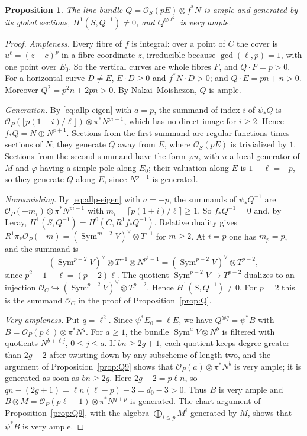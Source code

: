 \documentclass[11pt,a4paper]{article}
\theoremstyle{plain}
\newtheorem{proposition}[theorem]{Proposition}
\theoremstyle{remark}
\newcommand{\OO}{\mathcal O}
\newcommand{\Sym}{\operatorname{Sym}}
\begin{document}
\begin{proposition}\label{prop:allp-Q}
The line bundle $Q=\OO_S(pE)\otimes f^*N$ is ample and generated by its global sections, $H^1(S,Q^{-1})\neq0$, and
$Q^{\otimes\ell^2}$ is very ample.
\end{proposition}

\begin{proof}
\emph{Ampleness.} Every fibre of $f$ is integral: over a point of $C$ the cover is $u^{\ell}=(z-c)^p$ in a fibre
coordinate $z$, irreducible because $\gcd(\ell,p)=1$, with one point over $E_0$. So the vertical curves are whole
fibres $F$, and $Q\cdot F=p>0$. For a horizontal curve $D\ne E$, $E\cdot D\geq0$ and $f^*N\cdot D>0$; and
$Q\cdot E=pn+n>0$. Moreover $Q^2=p^2n+2pn>0$. By Nakai--Moishezon, $Q$ is ample.

\emph{Generation.} By \eqref{eq:allp-eigen} with $a=p$, the summand of index $i$ of $\psi_*Q$ is
$\OO_P(\lfloor p(1-i)/\ell\rfloor)\otimes\pi^*N^{pi+1}$, which has no direct image for $i\geq2$. Hence
$f_*Q=N\oplus N^{p+1}$. Sections from the first summand are regular functions times sections of $N$; they generate $Q$
away from $E$, where $\OO_S(pE)$ is trivialized by $1$. Sections from the second summand have the form $\varphi u$,
with $u$ a local generator of $M$ and $\varphi$ having a simple pole along $E_0$; their valuation along $E$ is
$1-\ell=-p$, so they generate $Q$ along $E$, since $N^{p+1}$ is generated.

\emph{Nonvanishing.} By \eqref{eq:allp-eigen} with $a=-p$, the summands of $\psi_*Q^{-1}$ are
$\OO_P(-m_i)\otimes\pi^*N^{pi-1}$ with $m_i=\lceil p(1+i)/\ell\rceil\geq1$. So $f_*Q^{-1}=0$ and, by Leray,
$H^1(S,Q^{-1})=H^0(C,R^1f_*Q^{-1})$. Relative duality gives $R^1\pi_*\OO_P(-m)=(\Sym^{m-2}V)^\vee\otimes T^{-1}$ for
$m\geq2$. At $i=p$ one has $m_p=p$, and the summand is
\[
 (\Sym^{p-2}V)^\vee\otimes T^{-1}\otimes N^{p^2-1}=(\Sym^{p-2}V)^\vee\otimes T^{p-2},
\]
since $p^2-1-\ell=(p-2)\ell$. The quotient $\Sym^{p-2}V\to T^{p-2}$ dualizes to an injection
$\OO_C\hookrightarrow(\Sym^{p-2}V)^\vee\otimes T^{p-2}$. Hence $H^1(S,Q^{-1})\neq0$. For $p=2$ this is the summand
$\OO_C$ in the proof of Proposition~\ref{prop:Q}.

\emph{Very ampleness.} Put $q=\ell^2$. Since $\psi^*E_0=\ell E$, we have $Q^{\otimes q}=\psi^*B$ with
$B=\OO_P(p\ell)\otimes\pi^*N^{q}$. For $a\geq1$, the bundle $\Sym^aV\otimes N^b$ is filtered with quotients
$N^{b+\ell j}$, $0\le j\le a$. If $bn\geq2g+1$, each quotient keeps degree greater than $2g-2$ after twisting down by
any subscheme of length two, and the argument of Proposition~\ref{prop:Q9} shows that $\OO_P(a)\otimes\pi^*N^b$ is very
ample; it is generated as soon as $bn\geq2g$. Here $2g-2=p\ell n$, so $qn-(2g+1)=\ell n(\ell-p)-3=d_0-3>0$. Thus $B$ is
very ample and $B\otimes M=\OO_P(p\ell-1)\otimes\pi^*N^{q+p}$ is generated. The chart argument of
Proposition~\ref{prop:Q9}, with the algebra $\bigoplus_{i\le p}M^i$ generated by $M$, shows that $\psi^*B$ is very ample.
\end{proof}
\end{document}
